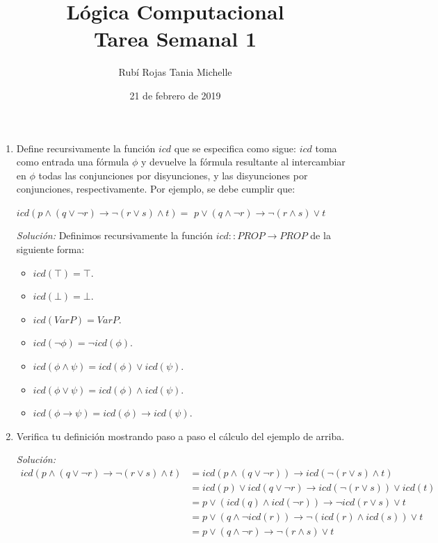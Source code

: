 \documentclass[letterpaper,12pt]{article}
\title{Lógica Computacional \\ Tarea Semanal 1}
\author{Rubí Rojas Tania Michelle}
\date{21 de febrero de 2019}
\begin{document}
\maketitle

\begin{enumerate}
    
    \item Define recursivamente la función $icd$ que se especifica como sigue:
    $icd$ toma como entrada una fórmula $\phi$ y devuelve la fórmula resultante
    al intercambiar en $\phi$ todas las conjunciones por disyunciones, y las 
    disyunciones por conjunciones, respectivamente. Por ejemplo, se debe 
    cumplir que:
    \begin{center}
        $icd (p \land (q \lor \neg r) \rightarrow \neg (r \lor s) \land t) = $
        $p \lor (q \land \neg r) \rightarrow \neg (r \land s) \lor t$
    \end{center}

    \textit{Solución:} Definimos recursivamente la función 
    $icd :: PROP \rightarrow PROP$ de la siguiente forma:
    \begin{itemize}
        \item $icd (\top) = \top$.
        \item $icd (\bot) = \bot$.
        \item $icd (Var P) = Var P$. 
        \item $icd (\neg \phi) = \neg icd(\phi)$. 
        \item $icd (\phi \land \psi) = icd(\phi) \lor icd(\psi)$. 
        \item $icd (\phi \lor \psi) = icd(\phi) \land icd(\psi)$. 
        \item $icd (\phi \rightarrow \psi) = icd(\phi) \rightarrow icd(\psi)$. 
    \end{itemize}

    \item Verifica tu definición mostrando paso a paso el cálculo del ejemplo 
    de arriba.

    \textit{Solución: }
    \begin{align*}
        icd(p \land (q \lor \neg r) \rightarrow \neg (r \lor s) \land t)
        &= icd(p \land (q\lor\neg r)) \rightarrow icd(\neg (r\lor s) \land t)\\
        &= icd(p) \lor icd(q\lor\neg r) \rightarrow icd( \neg(r\lor s)) \lor icd(t)\\
        &= p \lor (icd(q) \land icd(\neg r)) \rightarrow \neg icd(r \lor s) \lor t\\
        &= p \lor (q \land \neg icd(r)) \rightarrow \neg (icd(r) \land icd(s)) \lor t\\
        &= p \lor (q  \land \neg r) \rightarrow \neg (r \land s) \lor t
    \end{align*}


\end{enumerate}
\end{document}
